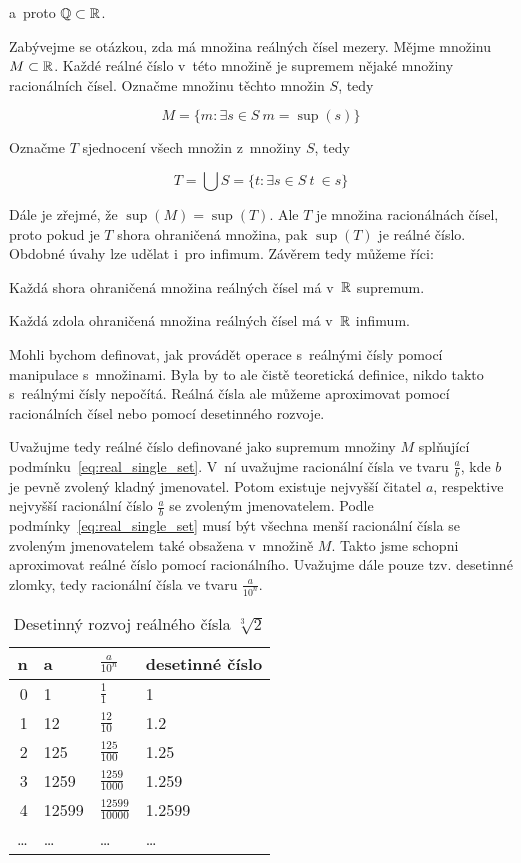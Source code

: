 a~proto \(\mathbb{Q} \subset \mathbb{R}\).

Zabývejme se otázkou, zda má množina reálných čísel mezery. Mějme množinu \(M \subset \mathbb{R}\). Každé reálné číslo v~této množině je supremem nějaké množiny racionálních čísel. Označme množinu těchto množin \(S\), tedy

\begin{equation}
M = \{m: \exists s \in S \ m = \sup(s)\}
\end{equation}
 
Označme \(T\) sjednocení všech množin z~množiny \(S\), tedy

\begin{equation}
T = \bigcup S = \{t: \exists s \in S \ t \ \in  s\}
\end{equation}

Dále je zřejmé, že \(\sup(M) = \sup(T)\). Ale \(T\) je množina racionálnách čísel, proto pokud je \(T\) shora ohraničená množina, pak \(\sup(T)\) je reálné číslo. Obdobné úvahy lze udělat i~pro infimum. Závěrem tedy můžeme říci:

\begin{fact}
Každá shora ohraničená množina reálných čísel má v~\(\mathbb{R}\) supremum.

Každá zdola ohraničená množina reálných čísel má v~\(\mathbb{R}\) infimum.
\end{fact}

Mohli bychom definovat, jak provádět operace s~reálnými čísly pomocí manipulace s~množinami. Byla by to ale čistě teoretická definice, nikdo takto s~reálnými čísly nepočítá. Reálná čísla ale můžeme aproximovat pomocí racionálních čísel nebo pomocí desetinného rozvoje.

Uvažujme tedy reálné číslo definované jako supremum množiny \(M\) splňující podmínku~\eqref{eq:real_single_set}. V~ní uvažujme racionální čísla ve tvaru \(\frac{a}{b}\), kde \(b\) je pevně zvolený kladný jmenovatel. Potom existuje nejvyšší čitatel \(a\), respektive nejvyšší racionální číslo \(\frac{a}{b}\) se zvoleným jmenovatelem. Podle podmínky~\eqref{eq:real_single_set} musí být všechna menší racionální čísla se zvoleným jmenovatelem také obsažena v~množině \(M\). Takto jsme schopni aproximovat reálné číslo pomocí racionálního. Uvažujme dále pouze tzv. desetinné zlomky, tedy racionální čísla ve tvaru \(\frac{a}{10^n}\).

\begin{table}[ht]
\centering
\begin{tabular}{|r|l|l|l|}
\hline
n & a & \(\frac{a}{10^n}\) & desetinné číslo\\
\hline
0 & 1 & \(\frac{1}{1}\) & 1 \\
1 & 12 & \(\frac{12}{10}\) & 1.2 \\
2 & 125 & \(\frac{125}{100}\) & 1.25 \\
3 & 1259 & \(\frac{1259}{1000}\) & 1.259 \\
4 & 12599 & \(\frac{12599}{10000}\) & 1.2599 \\
\ldots & \ldots & \ldots & \ldots \\
\hline
\end{tabular}
\caption{Desetinný rozvoj reálného čísla \(\sqrt[3]{2}\)}
\label{tab:real_decimal}
\end{table}

